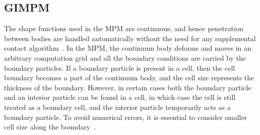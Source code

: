 \subsection{GIMPM}

The shape functions used in the 
MPM are continuous, and hence penetration between bodies are handled 
automatically without the need for any supplemental contact 
algorithm~\citep{Chen2002}. In the MPM, the continuum body deforms and moves in 
an arbitrary computation grid and all the boundary conditions are carried by 
the boundary particles. If a boundary particle is present in a cell, then the 
cell boundary becomes a part of the continuum body, and the cell size 
represents the thickness of the boundary. However, in certain cases both the 
boundary particle and an interior particle can be found in a cell, in which 
case the cell is still treated as a boundary cell, and the interior particle 
temporarily acts as a boundary particle. To avoid numerical errors, it is 
essential to consider smaller cell size along the boundary~\citep{Chen2002}. 


